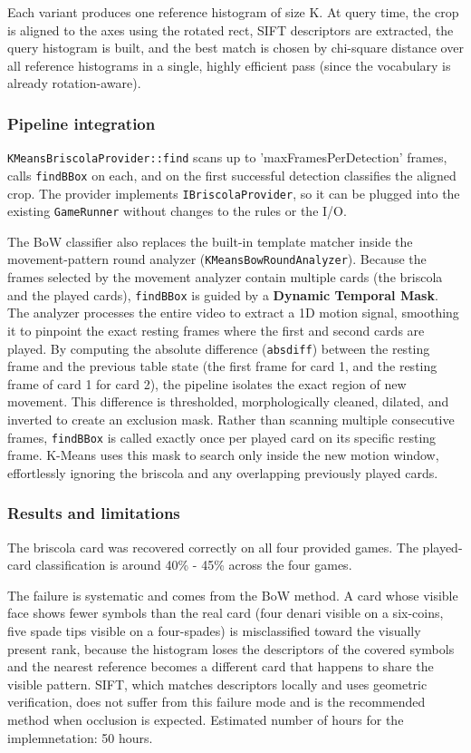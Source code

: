 \documentclass[11pt,a4paper]{article}
\begin{document}
Each variant produces one reference histogram of size K. At query time, the
crop is aligned to the axes using the rotated rect, SIFT descriptors are extracted,
the query histogram is built, and the best match is chosen by chi-square distance
over all reference histograms in a single, highly efficient pass (since the
vocabulary is already rotation-aware).

\subsubsection{Pipeline integration}

\texttt{KMeansBriscolaProvider::find} scans up to 'maxFramesPerDetection' frames, calls
\texttt{findBBox} on each, and on the first successful detection classifies the
aligned crop. The provider implements \texttt{IBriscolaProvider}, so it can be
plugged into the existing \texttt{GameRunner} without changes to the rules or
the I/O.

The BoW classifier also replaces the built-in template matcher inside the movement-pattern round analyzer
(\texttt{KMeansBowRoundAnalyzer}).
Because the frames selected by the movement analyzer contain multiple cards (the briscola and the 
played cards), \texttt{findBBox} is guided by a \textbf{Dynamic Temporal Mask}. The analyzer
processes the entire video to extract a 1D motion signal, smoothing it to pinpoint the exact
resting frames where the first and second cards are played. By computing the absolute difference
(\texttt{absdiff}) between the resting frame and the previous table state (the first frame for
card 1, and the resting frame of card 1 for card 2), the pipeline isolates the exact region of new
movement. This difference is thresholded, morphologically cleaned, dilated, and inverted to 
create an exclusion mask. Rather than scanning multiple consecutive frames, \texttt{findBBox} is 
called exactly once per played card on its specific resting frame. K-Means uses this mask to 
search only inside the new motion window, effortlessly ignoring the briscola and any overlapping 
previously played cards.
\subsubsection{Results and limitations}

The briscola card was recovered correctly on all four provided games. The
played-card classification is around 40\% - 45\% across the four games.

The failure is systematic and comes from the BoW method. A
card whose visible face shows fewer symbols than the real card (four denari
visible on a six-coins, five spade tips visible on a four-spades) is
misclassified toward the visually present rank, because the histogram loses
the descriptors of the covered symbols and the nearest reference becomes a
different card that happens to share the visible pattern. SIFT, which matches
descriptors locally and uses geometric verification, does not suffer from
this failure mode and is the recommended method when occlusion is expected.
Estimated number of hours for the implemnetation: 50 hours. 
\end{document}
